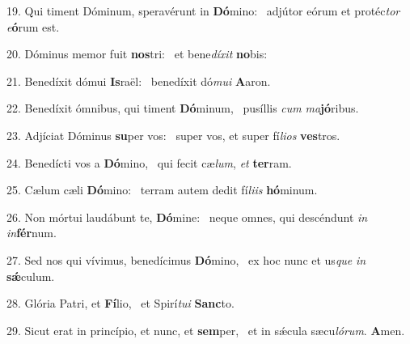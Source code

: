 19. Qui timent Dóminum, speravérunt in \textbf{Dó}mino: \ast\  adjútor eórum et protéc\textit{tor} \textit{e}\textbf{ó}rum est.\

20. Dóminus memor fuit \textbf{nos}tri: \ast\  et bene\textit{dí}\textit{xit} \textbf{no}bis:\

21. Benedíxit dómui \textbf{Is}raël: \ast\  benedíxit dó\textit{mu}\textit{i} \textbf{A}aron.\

22. Benedíxit ómnibus, qui timent \textbf{Dó}minum, \ast\  pusíllis \textit{cum} \textit{ma}\textbf{jó}ribus.\

23. Adjíciat Dóminus \textbf{su}per vos: \ast\  super vos, et super fí\textit{li}\textit{os} \textbf{ves}tros.\

24. Benedícti vos a \textbf{Dó}mino, \ast\  qui fecit cæ\textit{lum}, \textit{et} \textbf{ter}ram.\

25. Cælum cæli \textbf{Dó}mino: \ast\  terram autem dedit fí\textit{li}\textit{is} \textbf{hó}minum.\

26. Non mórtui laudábunt te, \textbf{Dó}mine: \ast\  neque omnes, qui descéndunt \textit{in} \textit{in}\textbf{fér}num.\

27. Sed nos qui vívimus, benedícimus \textbf{Dó}mino, \ast\  ex hoc nunc et us\textit{que} \textit{in} \textbf{sǽ}culum.\

28. Glória Patri, et \textbf{Fí}lio, \ast\  et Spirí\textit{tu}\textit{i} \textbf{Sanc}to.\

29. Sicut erat in princípio, et nunc, et \textbf{sem}per, \ast\  et in sǽcula sæcu\textit{ló}\textit{rum}. \textbf{A}men.\

